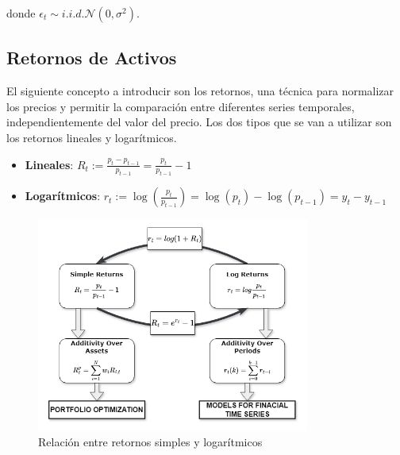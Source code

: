 \documentclass[a4paper,12pt]{report}
\begin{document}
donde $\epsilon_t \sim i.i.d. \mathcal{N}(0, \sigma^2)$.

\subsection{Retornos de Activos}

El siguiente concepto a introducir son los retornos, una técnica para normalizar los precios y permitir la comparación 
entre diferentes series temporales, independientemente del valor del precio. Los dos tipos que se van a utilizar son 
los retornos lineales y logarítmicos.

\begin{itemize}
    \item \textbf{Lineales}: $R_t := \frac{p_t - p_{t-1}}{p_{t-1}} = \frac{p_t}{p_{t-1}} - 1$
    \item \textbf{Logarítmicos}: $r_t := \log\left(\frac{p_t}{p_{t-1}}\right) = \log(p_t) - \log(p_{t-1}) = y_t - y_{t-1}$
\end{itemize}






\begin{figure}[H]
    \centering
    \includegraphics[width=0.8\textwidth]{figures/simple_and_log_ret_relation.png}
    \caption{Relación entre retornos simples y logarítmicos}
    \label{fig:log-returns}
\end{figure}



\end{document}

